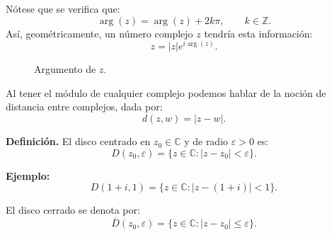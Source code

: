 \documentclass[a4paper,12pt]{article}
\begin{document}
\medskip
\noindent
Nótese que se verifica que:
\[
\arg(z) = \arg(z) + 2k\pi, \qquad k \in \mathbb{Z}.
\]
Así, geométricamente, un número complejo $z$ tendría esta información:
\[
z = |z| e^{i\arg(z)}.
\]

\begin{figure}[h]
\centering
{}

\medskip
{\small Argumento de \(z\).}
\end{figure}
\noindent
Al tener el módulo de cualquier complejo podemos hablar de la noción de distancia entre complejos,
dada por:
\[
d(z,w) = |z-w|.
\]

\newpage
\noindent
\noindent\textbf{Definición.} El disco centrado en $z_0 \in \mathbb{C}$ y de radio $\varepsilon > 0$ es:
\[
D(z_0,\varepsilon) = \{ z \in \mathbb{C} : |z - z_0| < \varepsilon \}.
\]

\noindent\textbf{Ejemplo:} 
\[
D(1+i,1) = \{ z \in \mathbb{C} : |z-(1+i)| < 1 \}.
\]

El disco cerrado se denota por:
\[
\overline{D}(z_0,\varepsilon) = \{ z \in \mathbb{C} : |z - z_0| \leq \varepsilon \}.
\]
\end{document}
